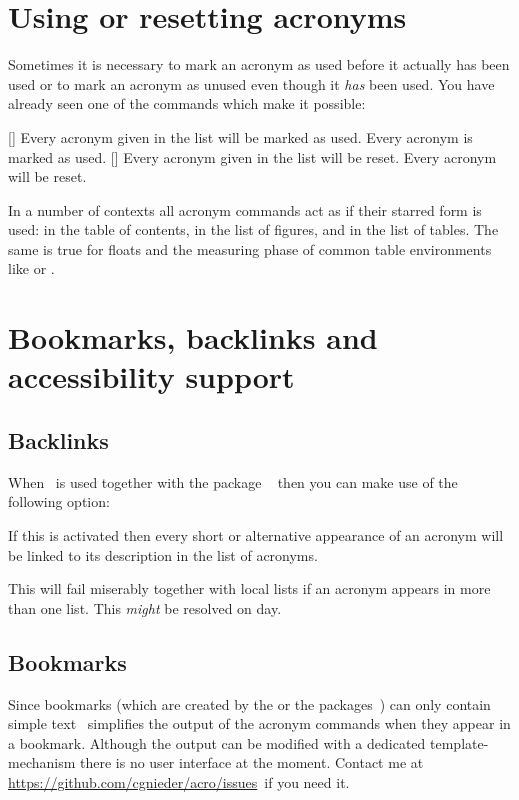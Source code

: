 \documentclass{acro-manual}
\newcommand*\issues{\url{https://github.com/cgnieder/acro/issues}}
\begin{document}
\section{Using or resetting acronyms}\label{sec:using-or-resetting}
Sometimes it is necessary to mark an acronym as used before it actually has
been used or to mark an acronym as unused even though it \emph{has} been
used.  You have already seen one of the commands which make it possible:
\begin{commands}
  []
    Every acronym given in the list will be marked as used.
    Every acronym is marked as used.
  []
    Every acronym given in the list will be reset.
    Every acronym will be reset.
\end{commands}

\begin{bewareofthedog}
  In a number of contexts all acronym commands act as if their starred form is
  used: in the table of contents, in the list of figures, and in the list of
  tables.  The same is true for floats and the measuring phase of common
  table environments like  or .
\end{bewareofthedog}

\section{Bookmarks, backlinks and accessibility support}\label{sec:pdf-properties}
\subsection{Backlinks}\label{sec:backlinks}
When \acro\ is used together with the package
~\cite{pkg:hyperref} then you can make use of the following
option:
\begin{options}
    If this is activated then every short or alternative appearance of an
    acronym will be linked to its description in the list of acronyms.
\end{options}
\begin{bewareofthedog}
  This will fail miserably together with local lists if an acronym appears in
  more than one list.  This \emph{might} be resolved on day.
\end{bewareofthedog}

\subsection{Bookmarks}\label{sec:bookmarks}
Since bookmarks (which are created by the  or the 
packages~\cite{pkg:bookmark}) can only contain simple text \acro\ simplifies
the output of the acronym commands when they appear in a bookmark.  Although
the output can be modified with a dedicated template-mechanism there is no
user interface at the moment.  Contact me at \issues\ if you need it.
\end{document}
